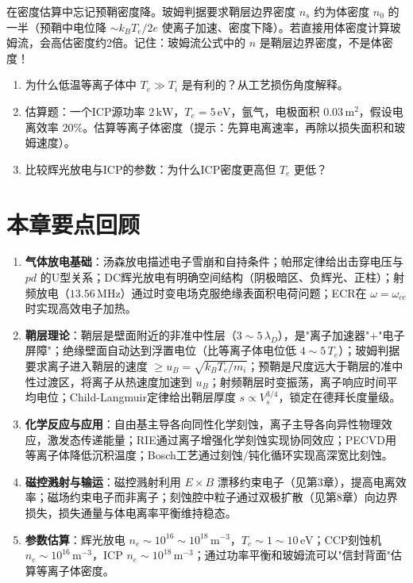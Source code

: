 \begin{warning}{}{}
在密度估算中忘记预鞘密度降。玻姆判据要求鞘层边界密度 $n_s$ 约为体密度 $n_0$ 的一半（预鞘中电位降 $\sim k_B T_e/2e$ 使离子加速、密度下降）。若直接用体密度计算玻姆流，会高估密度约2倍。记住：玻姆流公式中的 $n$ 是鞘层边界密度，不是体密度！
\end{warning}

\begin{miniquiz}
\begin{enumerate}
\item 为什么低温等离子体中 $T_e \gg T_i$ 是有利的？从工艺损伤角度解释。
\item 估算题：一个ICP源功率 $2\,\mathrm{kW}$，$T_e = 5\,\mathrm{eV}$，氩气，电极面积 $0.03\,\mathrm{m^2}$，假设电离效率 $20\%$。估算等离子体密度（提示：先算电离速率，再除以损失面积和玻姆速度）。
\item 比较辉光放电与ICP的参数：为什么ICP密度更高但 $T_e$ 更低？
\end{enumerate}
\end{miniquiz}

\section{本章要点回顾}

\begin{chapterreview}
\begin{enumerate}
\item \textbf{气体放电基础}：汤森放电描述电子雪崩和自持条件；帕邢定律给出击穿电压与 $pd$ 的U型关系；DC辉光放电有明确空间结构（阴极暗区、负辉光、正柱）；射频放电（$13.56\,\mathrm{MHz}$）通过时变电场克服绝缘表面积电荷问题；ECR在 $\omega = \omega_{ce}$ 时实现高效电子加热。

\item \textbf{鞘层理论}：鞘层是壁面附近的非准中性层（$3\sim 5\,\lambda_D$），是"离子加速器"+"电子屏障"；绝缘壁面自动达到浮置电位（比等离子体电位低 $4\sim 5\,T_e$）；玻姆判据要求离子进入鞘层的速度 $\ge u_B = \sqrt{k_B T_e/m_i}$；预鞘是尺度远大于鞘层的准中性过渡区，将离子从热速度加速到 $u_B$；射频鞘层时变振荡，离子响应时间平均电位；Child-Langmuir定律给出鞘层厚度 $s \propto V_s^{3/4}$，锁定在德拜长度量级。

\item \textbf{化学反应与应用}：自由基主导各向同性化学刻蚀，离子主导各向异性物理效应，激发态传递能量；RIE通过离子增强化学刻蚀实现协同效应；PECVD用等离子体降低沉积温度；Bosch工艺通过刻蚀/钝化循环实现高深宽比刻蚀。

\item \textbf{磁控溅射与输运}：磁控溅射利用 $E\times B$ 漂移约束电子（见第3章），提高电离效率；磁场约束电子而非离子；刻蚀腔中粒子通过双极扩散（见第8章）向边界损失，损失通量与体电离率平衡维持稳态。

\item \textbf{参数估算}：辉光放电 $n_e \sim 10^{16}\sim 10^{18}\,\mathrm{m^{-3}}$，$T_e \sim 1\sim 10\,\mathrm{eV}$；CCP刻蚀机 $n_e \sim 10^{16}\,\mathrm{m^{-3}}$，ICP $n_e \sim 10^{18}\,\mathrm{m^{-3}}$；通过功率平衡和玻姆流可以"信封背面"估算等离子体密度。
\end{enumerate}
\end{chapterreview}

\newpage
